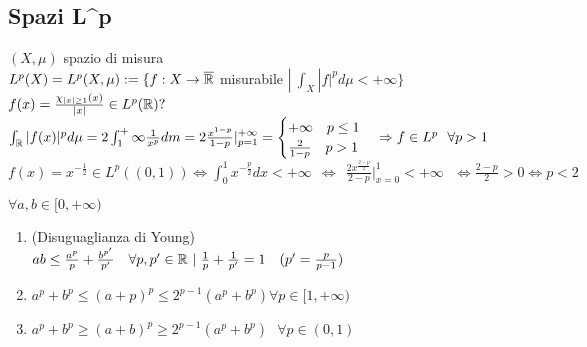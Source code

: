 \documentclass[12px]{article}
\begin{document}
	\subsection{Spazi L^p}
	$(X,\mu)$ spazio di misura\\
	$L^p(X) = L^p(X,\mu):=\{f:X \rightarrow \overline{\mathbb{R}}$ misurabile $| \ \int_X|f|^p d\mu < +\infty\}$\\
	$f(x) = \frac{\chi_{|x|\geq 1}(x)}{|x|}\in L^p(\mathbb{R})?$\\
	$\int_{\mathbb{R}}|f(x)|^pd\mu = 2\int_1^+\infty \frac{1}{x^p}d m = 2\frac{x^{1-p}}{1-p}|^{+\infty}_{p=1}= \begin{cases}
		+\infty \ \ \ p\leq 1\\
		\frac{2}{1-p}\ \ \ p > 1
	\end{cases} \Rightarrow f\in L^p\ \ \forall p > 1$ \\
$\displaystyle f(x) = x^{-\frac 12}\in L^p((0,1)) \Leftrightarrow\int_0^1 x^{-\frac p 2}dx < +\infty\ \ \Leftrightarrow\ \ \frac{2x^{\frac{2-p}{2}}}{2-p}|^1_{x=0} < +\infty\ \  \ \Leftrightarrow \frac{2-p}{2} > 0 \Leftrightarrow p < 2$
	\begin{lemm}
		$\forall a,b\in[0,+\infty)$
		\begin{enumerate}
			\item (Disuguaglianza di Young)\\
				$ab\leq \frac{a^p}{p} + \frac{b^{p'}}{p'} \ \ \ \forall p,p'\in\R\ |\ \frac 1p + \frac 1 {p'} = 1\ \ \ (p' = \frac{p}{p-1})$
			\item  $a^p + b^p \leq (a+p)^p\leq 2^{p-1}(a^p + b^p)\forall p\in [1,+\infty)$
			\item  $a^p + b^p\geq (a+b)^p\geq 2^{p-1}(a^p + b^p)\ \ \ \forall p\in (0,1)$
		\end{enumerate}
	\end{lemm}
\end{document}
